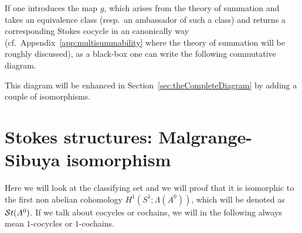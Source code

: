 If one introduces the map $g$, which arises from the theory of summation and
takes an equivalence class (resp.\ an ambassador of such a class) and returns a
corresponding Stokes cocycle in an canonically way
(cf.\ Appendix~\ref{app:multisummability} where the theory of summation  will
be roughly discussed), as a black-box one can write the following commutative
diagram.
\begin{center}
\end{center}\label{page:ofPreDiagram}
This diagram will be enhanced in Section~\ref{sec:theCompleteDiagram} by
adding a couple of isomorphisms.

\section{Stokes structures: Malgrange-Sibuya isomorphism}\label{sec:mainThm1}
Here we will look at the classifying set and we will proof that it is
isomorphic \TODO[as\dots] to the first non abelian cohomology 
$H^1(S^1;\Lambda(A^0))$, which will be denoted as $\mathcal{S}{}t(A^0)$.
If we talk about cocycles or cochains, we will in the following always mean
$1$-cocycles or $1$-cochains.

